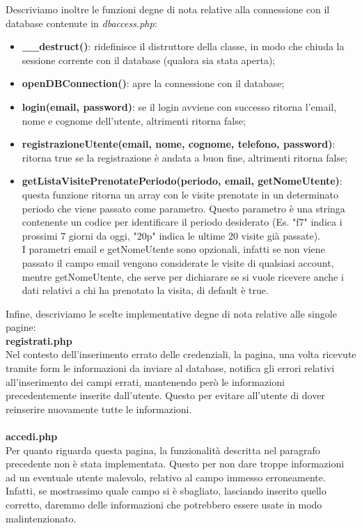 \pagebreak


Descriviamo inoltre le funzioni degne di nota relative alla connessione con il database contenute in \textit{dbaccess.php}:
\begin{itemize}
\item \textbf{\_\_destruct()}: ridefinisce il distruttore della classe, in modo che chiuda la sessione corrente con il database (qualora sia stata aperta);
\item \textbf{openDBConnection()}: apre la connessione con il database;
\item \textbf{login(email, password)}: se il login avviene con successo ritorna l'email, nome e cognome dell'utente, altrimenti ritorna false;
\item \textbf{registrazioneUtente(email, nome, cognome, telefono, password)}: ritorna true se la registrazione è andata a buon fine, altrimenti ritorna false;
\item \textbf{getListaVisitePrenotatePeriodo(periodo, email, getNomeUtente)}: questa funzione ritorna un array con le visite prenotate in un determinato periodo che viene passato come parametro. Questo parametro è una stringa contenente un codice per identificare il periodo desiderato (Es. "f7" indica i prossimi 7 giorni da oggi, "20p" indica le ultime 20 visite già passate). \\I parametri email e getNomeUtente sono opzionali, infatti se non viene passato il campo email vengono considerate le visite di qualsiasi account, mentre getNomeUtente, che serve per dichiarare se si vuole ricevere anche i dati relativi a chi ha prenotato la visita, di default è true.
\end{itemize}

\pagebreak

Infine, descriviamo le scelte implementative degne di nota relative alle singole pagine: \\

\textbf{registrati.php} \\ 
Nel contesto dell'inserimento errato delle credenziali, la pagina, una volta ricevute tramite form le informazioni da inviare al database, notifica gli errori relativi all'inserimento dei campi errati, mantenendo però le informazioni precedentemente inserite dall'utente. Questo per evitare all'utente di dover reinserire nuovamente tutte le informazioni. \\ \\

\textbf{accedi.php} \\ 
Per quanto riguarda questa pagina, la funzionalità descritta nel paragrafo precedente non è stata implementata. Questo per non dare troppe informazioni ad un eventuale utente malevolo, relativo al campo immesso erroneamente. Infatti, se mostrassimo quale campo si è sbagliato, lasciando inserito quello corretto, daremmo delle informazioni che potrebbero essere usate in modo malintenzionato. \\ \\

